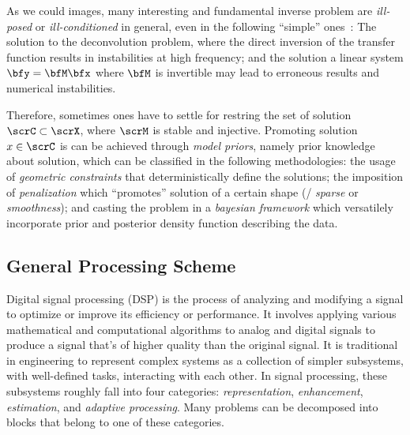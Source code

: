 As we could images, many interesting and fundamental inverse problem are
\textit{ill-posed} or \textit{ill-conditioned} in general, even in the following ``simple'' ones~\cite{kitic2015cosparse}:
The solution to the deconvolution problem, where the direct inversion of the transfer function results in instabilities
at high frequency; and the solution a linear system $\bfy = \bfM \bfx$ where $\bfM$ is invertible
may lead to erroneous results and numerical instabilities.

Therefore, sometimes ones have to settle for restring the set of solution $\scrC \subset \scrX$,
where $\scrM$ is stable and injective.
Promoting solution $x \in \scrC$ is can be achieved through \textit{model priors}, namely prior knowledge about solution, which can
be classified in the following methodologies:
the usage of \textit{geometric constraints} that deterministically define the solutions; the imposition of \textit{penalization}
which ``promotes'' solution of a certain shape (\eg/ \textit{sparse}
 or \textit{smoothness});
and casting the problem in a \textit{bayesian framework} which versatilely incorporate prior and posterior density function describing the data.

\subsection{General Processing Scheme}
Digital signal processing (DSP) is the process of analyzing and modifying a signal to optimize or improve its efficiency or performance. It involves applying various mathematical and computational algorithms to analog and digital signals to produce a signal that's of higher quality than the original signal.
It is traditional in engineering to represent complex systems as a collection of simpler subsystems, with well-defined tasks, interacting with each other.
In signal processing, these subsystems roughly fall into four categories: \textit{representation}, \textit{enhancement}, \textit{estimation}, and \textit{adaptive processing}.
Many problems can be decomposed into blocks that belong to one of these categories.


